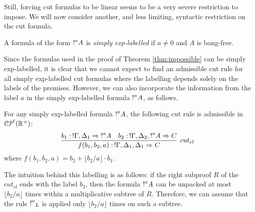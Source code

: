 Still, forcing cut formulas to be linear seems to be a very severe restriction to impose. We will now consider another, and less limiting, syntactic restriction on the cut formula. 

\begin{definition} A formula of the form $\hbox{$\mathop{!}^{a}$} A $ is \emph{simply exp-labelled} if $a\neq 0$ and $A$ is bang-free.
\end{definition}

Since the formulas used in the proof of Theorem \ref{thm:impossible} can be simply exp-labelled, it is clear that we cannot expect to find an admissible cut rule for all simply exp-labelled cut formulas where the labelling depends solely on the labels of the premises. However, we can also incorporate the information from the label $a$ in the simply exp-labelled formula $\hbox{$\mathop{!}^{a}$} A$, as follows.

%

\begin{theorem}\label{theorem:cut}
For any simply exp-labelled formula $\hbox{$\mathop{!}^{a}$} A $, the following cut rule is admissible in $\mathcal{CP}^\ell(\mathbb{R}^{+})$:
$$
\infer[cut_{el}]{f(b_1,b_2,a):\,!\Gamma,\Delta_1,\Delta_1\seq C}{b_1:\,!\Gamma,\Delta_1\seq  \nbang{a} A  & b_2:\,!\Gamma,\Delta_2,\nbang{a} A \seq C}
$$
where $f(b_1,b_2,a)=b_2+\lfloor b_2/a \rfloor\cdot b_1$.
\end{theorem}
The intuition behind this labelling is as follows: if the right subproof $R$ of the $cut_{el}$ ends with the label $b_2$, then the formula $\hbox{$\mathop{!}^{a}$} A$ can be unpacked at most $\lfloor b_2/a \rfloor$ times within a multiplicative subtree of $R$. Therefore, we can assume that the rule $\hbox{$\mathop{!}^{a}$}_L$ is applied only $\lfloor b_2/a \rfloor$ times on such a subtree.


